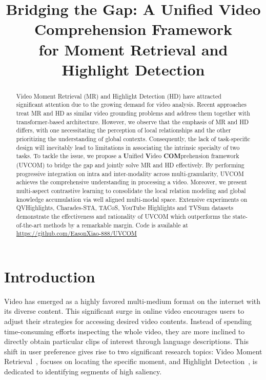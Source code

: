 \title{Bridging the Gap: A Unified Video Comprehension Framework \\for Moment Retrieval and Highlight Detection}



\maketitle
\begin{abstract}
Video Moment Retrieval (MR) and Highlight Detection (HD) have attracted significant attention due to the growing demand for video analysis.
Recent approaches treat MR and HD as similar video grounding problems and address them together with transformer-based architecture.
However, we observe that the emphasis of MR and HD differs, with one necessitating the perception of local relationships and the other prioritizing the understanding of global contexts.
Consequently, the lack of task-specific design will inevitably lead to limitations in associating the intrinsic specialty of two tasks.
To tackle the issue, we propose a \textbf{U}nified \textbf{V}ideo \textbf{COM}prehension framework (UVCOM) to bridge the gap and jointly solve MR and HD effectively.
By performing progressive integration on intra and inter-modality across multi-granularity, UVCOM achieves the comprehensive understanding in processing a video.
Moreover, we present multi-aspect contrastive learning to consolidate the local relation modeling and global knowledge accumulation via well aligned multi-modal space.
Extensive experiments on QVHighlights, Charades-STA, TACoS, YouTube Highlights and TVSum datasets demonstrate the effectiveness and rationality of UVCOM which outperforms the state-of-the-art methods by a remarkable margin.
Code is available at \href{https://github.com/EasonXiao-888/UVCOM}{https://github.com/EasonXiao-888/UVCOM}

\end{abstract}\section{Introduction}
\label{sec:intro}
Video has emerged as a highly favored multi-medium format on the internet with its diverse content.
This significant surge in online video encourages users to adjust their strategies for accessing desired video contents.
Instead of spending time-consuming efforts inspecting the whole video, they are more inclined to directly obtain particular clips of interest through language descriptions.
This shift in user preference gives rise to two significant research topics: Video Moment Retrieval~\cite{ctrl,early_mr_1,man,recent_mr_1,recent_mr_2}, focuses on locating the specific moment, and Highlight Detection~\cite{video2gif,Yao_2016,cvs,LIM-s,joint_va}, is dedicated to identifying segments of high saliency.

